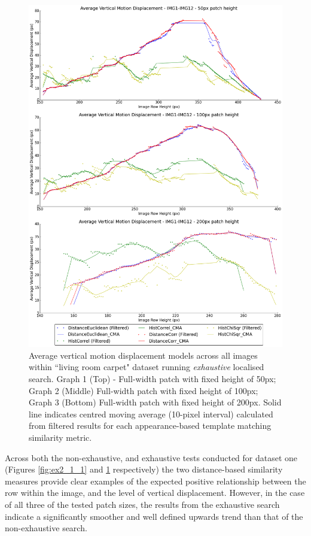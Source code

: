 \clearpage
\begin{figure}[ht!]
\centering
\includegraphics[scale=0.3]{images/results/flat_10cm_non_scaled_exhaustive}
\caption{Average vertical motion displacement models across all images within ``living room carpet" dataset running \textit{exhaustive} localised search. Graph 1 (Top) - Full-width patch with fixed height of 50px; Graph 2 (Middle) Full-width patch with fixed height of 100px; Graph 3 (Bottom) Full-width patch with fixed height of 200px. Solid line indicates centred moving average (10-pixel interval) calculated from filtered results for each appearance-based template matching similarity metric.}
\label{fig:ex2_1_2}
\end{figure}

Across both the non-exhaustive, and exhaustive tests conducted for dataset one (Figures \ref{fig:ex2_1_1} and \ref{fig:ex2_1_2} respectively) the two distance-based similarity measures provide clear examples of the expected positive relationship between the row within the image, and the level of vertical displacement. However, in the case of all three of the tested patch sizes, the results from the exhaustive search indicate a significantly smoother and well defined upwards trend than that of the non-exhaustive search.


